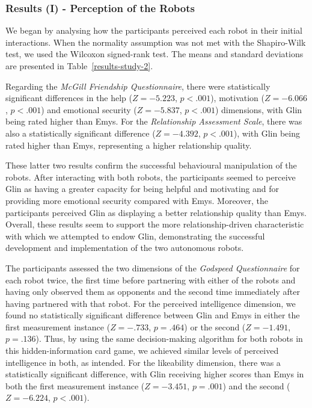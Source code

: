 \subsubsection{Results (I) - Perception of the Robots}

We began by analysing how the participants perceived each robot in their initial interactions. When the normality assumption was not met with the Shapiro-Wilk test, we used the Wilcoxon signed-rank test. The means and standard deviations are presented in Table~\ref{results-study-2}.


Regarding the \textit{McGill Friendship Questionnaire}, the\-re were statistically significant differences in the help ($Z=-5.223$, $p<.001$), motivation ($Z=-6.066$, $p<.001$) and emotional security ($Z=-5.837$, $p<.001$) dimensions, with Glin being rated higher than Emys.
For the \textit{Relationship Assessment Scale}, there was also a statistically significant difference ($Z=-4.392$, $p<.001$), with Glin being rated higher than Emys, representing a higher relationship quality. 

These latter two results confirm the successful behavioural manipulation of the robots. After interacting with both robots, the participants seemed to perceive Glin as having a greater capacity for being helpful and motivating and for providing more emotional security compared with Emys. Moreover, the participants perceived Glin as displaying a better relationship quality than Emys.
Overall, these results seem to support the more relationship-driven characteristic with which we attempted to endow Glin, demonstrating the successful development and implementation of the two autonomous robots. 


The participants assessed the two dimensions of the \textit{Godspeed Questionnaire} for each robot twice, the first time before partnering with either of the robots and having only observed them as opponents and the second time immediately after having partnered with that robot. 
For the perceived intelligence dimension, we found no statistically significant difference between Glin and Emys in either the first measurement instance ($Z=-.733$, $p=.464$) or the second ($Z=-1.491$, $p=.136$). Thus, by using the same decision-making algorithm for both robots in this hidden-information card game, we achieved similar levels of perceived intelligence in both, as intended.
For the likeability dimension, there was a statistically significant difference, with Glin receiving higher scores than Emys in both the first measurement instance ($Z=-3.451$, $p=.001$) and the second ($Z=-6.224$, $p<.001$).



